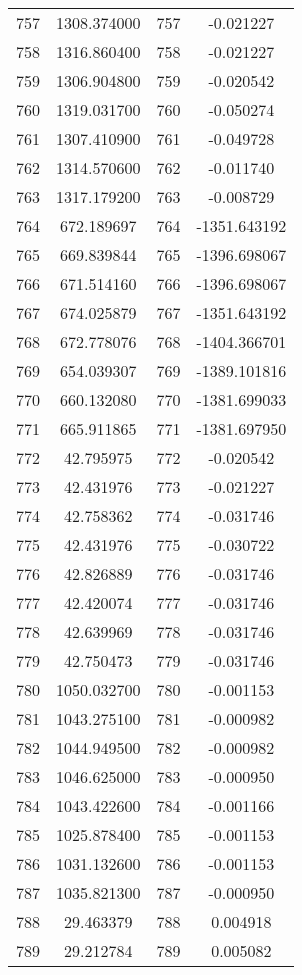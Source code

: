 \documentclass[12pt]{article}
\begin{document}
\begin{longtable}{@{}cccc@{}}
757 & 1308.374000 & 757 & -0.021227 \\
758 & 1316.860400 & 758 & -0.021227 \\
759 & 1306.904800 & 759 & -0.020542 \\
760 & 1319.031700 & 760 & -0.050274 \\
761 & 1307.410900 & 761 & -0.049728 \\
762 & 1314.570600 & 762 & -0.011740 \\
763 & 1317.179200 & 763 & -0.008729 \\
764 & 672.189697 & 764 & -1351.643192 \\
765 & 669.839844 & 765 & -1396.698067 \\
766 & 671.514160 & 766 & -1396.698067 \\
767 & 674.025879 & 767 & -1351.643192 \\
768 & 672.778076 & 768 & -1404.366701 \\
769 & 654.039307 & 769 & -1389.101816 \\
770 & 660.132080 & 770 & -1381.699033 \\
771 & 665.911865 & 771 & -1381.697950 \\
772 & 42.795975 & 772 & -0.020542 \\
773 & 42.431976 & 773 & -0.021227 \\
774 & 42.758362 & 774 & -0.031746 \\
775 & 42.431976 & 775 & -0.030722 \\
776 & 42.826889 & 776 & -0.031746 \\
777 & 42.420074 & 777 & -0.031746 \\
778 & 42.639969 & 778 & -0.031746 \\
779 & 42.750473 & 779 & -0.031746 \\
780 & 1050.032700 & 780 & -0.001153 \\
781 & 1043.275100 & 781 & -0.000982 \\
782 & 1044.949500 & 782 & -0.000982 \\
783 & 1046.625000 & 783 & -0.000950 \\
784 & 1043.422600 & 784 & -0.001166 \\
785 & 1025.878400 & 785 & -0.001153 \\
786 & 1031.132600 & 786 & -0.001153 \\
787 & 1035.821300 & 787 & -0.000950 \\
788 & 29.463379 & 788 & 0.004918 \\
789 & 29.212784 & 789 & 0.005082 \\

\end{longtable}
\end{document}
